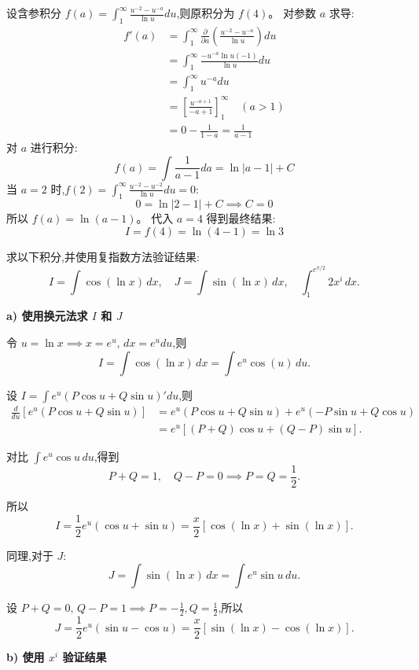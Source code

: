\begin{questions}
\begin{solution}
设含参积分 $f(a) = \int_{1}^{\infty} \frac{u^{-2} - u^{-a}}{\ln u} du$,则原积分为 $f(4)$。
对参数 $a$ 求导:
\begin{align*}
f'(a) &= \int_{1}^{\infty} \frac{\partial}{\partial a} \left( \frac{u^{-2} - u^{-a}}{\ln u} \right) du \\
&= \int_{1}^{\infty} \frac{-u^{-a} \ln u (-1)}{\ln u} du \\
&= \int_{1}^{\infty} u^{-a} du \\
&= \left[ \frac{u^{-a+1}}{-a+1} \right]_{1}^{\infty} \quad (a > 1) \\
&= 0 - \frac{1}{1-a} = \frac{1}{a-1}
\end{align*}
对 $a$ 进行积分:
\[ f(a) = \int \frac{1}{a-1} da = \ln|a-1| + C \]
当 $a=2$ 时,$f(2) = \int_{1}^{\infty} \frac{u^{-2} - u^{-2}}{\ln u} du = 0$:
\[ 0 = \ln|2-1| + C \implies C = 0 \]
所以 $f(a) = \ln(a-1)$。
代入 $a=4$ 得到最终结果:
\[ I = f(4) = \ln(4-1) = \ln 3 \]
\end{solution}

\question
求以下积分,并使用复指数方法验证结果:
\[
I = \int \cos(\ln x) \, dx, \quad J = \int \sin(\ln x) \, dx, \quad \int_{1}^{e^{\pi/2}} 2x^i \, dx.
\]

\begin{solution}
\textbf{a) 使用换元法求 $I$ 和 $J$}

令 $u = \ln x \implies x = e^u, \, dx = e^u du$,则
\[
I = \int \cos(\ln x) \, dx = \int e^u \cos(u) \, du.
\]

设 $I = \int e^u (P\cos u + Q\sin u)' du$,则
\begin{align*}
\frac{d}{du}[e^u(P\cos u + Q\sin u)] &= e^u(P\cos u + Q\sin u) + e^u(-P\sin u + Q\cos u) \\
&= e^u[(P+Q)\cos u + (Q-P)\sin u].
\end{align*}

对比 $\int e^u \cos u \, du$,得到
\[
P + Q = 1, \quad Q - P = 0 \implies P = Q = \frac{1}{2}.
\]

所以
\[
I = \frac{1}{2} e^u (\cos u + \sin u) = \frac{x}{2} [\cos(\ln x) + \sin(\ln x)].
\]

同理,对于 $J$:
\[
J = \int \sin(\ln x) \, dx = \int e^u \sin u \, du.
\]

设 $P+Q = 0, \, Q-P = 1 \implies P=-\frac{1}{2}, Q=\frac{1}{2}$,所以
\[
J = \frac{1}{2} e^u (\sin u - \cos u) = \frac{x}{2} [\sin(\ln x) - \cos(\ln x)].
\]

\medskip
\textbf{b) 使用 $x^i$ 验证结果}


\end{solution}
\end{questions}
